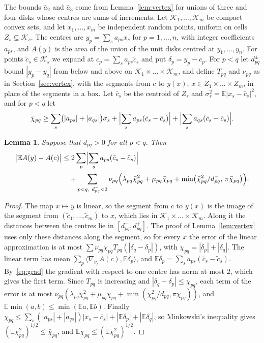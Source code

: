 \documentclass[11pt]{amsart}
\newtheorem{lemma}[theorem]{Lemma}
\theoremstyle{definition}
\theoremstyle{remark}
\numberwithin{equation}{section}
\newcommand{\E}{\mathbb{E}}
\begin{document}
The bounds $\bar a_2$ and $\bar a_3$ come from Lemma~\ref{lem:vertex} for unions of three and four disks whose centres are sums of increments. Let $\mathcal K_1,\dots,\mathcal K_m$ be compact convex sets, and let $x_1,\dots,x_m$ be independent random points, uniform on cells $Z_s\subseteq\mathcal K_s$. The centres are $y_p=\sum_sa_{ps}x_s$ for $p=1,\dots,n$, with integer coefficients $a_{ps}$, and $A(y)$ is the area of the union of the unit disks centred at $y_1,\dots,y_n$. For points $\tilde c_s\in\mathcal K_s$ we expand at $c_p=\sum_sa_{ps}\tilde c_s$ and put $\delta_p=y_p-c_p$. For $p<q$ let $d^\pm_{pq}$ bound $|y_p-y_q|$ from below and above on $\mathcal K_1\times\dots\times\mathcal K_m$, and define $T_{pq}$ and $\nu_{pq}$ as in Section~\ref{sec:vertex}, with the segments from $c$ to $y(x)$, $x\in Z_1\times\dots\times Z_m$, in place of the segments in a box. Let $\bar c_s$ be the centroid of $Z_s$ and $\sigma_s^2=\E|x_s-\bar c_s|^2$, and for $p<q$ let
\[
\bar\chi_{pq}\ge\sum_s\bigl(|a_{ps}|+|a_{qs}|\bigr)\sigma_s+\Bigl|\sum_sa_{ps}(\bar c_s-\tilde c_s)\Bigr|+\Bigl|\sum_sa_{qs}(\bar c_s-\tilde c_s)\Bigr|.
\]

\begin{lemma}\label{lem:linear}
Suppose that $d^-_{pq}>0$ for all $p<q$. Then
\begin{align*}
\bigl|\E A(y)-A(c)\bigr|&\le2\sum_p\Bigl|\sum_sa_{ps}(\bar c_s-\tilde c_s)\Bigr|\\
&\quad+\sum_{p<q,\ d^-_{pq}<2}\nu_{pq}\Bigl(\lambda_{pq}\bar\chi_{pq}^2+\mu_{pq}\bar\chi_{pq}+\min\bigl(\bar\chi_{pq}^2/d^-_{pq},\,\pi\bar\chi_{pq}\bigr)\Bigr).
\end{align*}
\end{lemma}

\begin{proof}
The map $x\mapsto y$ is linear, so the segment from $c$ to $y(x)$ is the image of the segment from $(\tilde c_1,\dots,\tilde c_m)$ to $x$, which lies in $\mathcal K_1\times\dots\times\mathcal K_m$. Along it the distances between the centres lie in $[d^-_{pq},d^+_{pq}]$. The proof of Lemma~\ref{lem:vertex} uses only these distances along the segment, so for every $x$ the error of the linear approximation is at most $\sum\nu_{pq}\chi_{pq}T_{pq}(|\delta_q-\delta_p|)$, with $\chi_{pq}=|\delta_p|+|\delta_q|$. The linear term has mean $\sum_p\langle\nabla_{y_p}A(c),\E\delta_p\rangle$, and $\E\delta_p=\sum_sa_{ps}(\bar c_s-\tilde c_s)$. By~\eqref{eq:grad} the gradient with respect to one centre has norm at most $2$, which gives the first term. Since $T_{pq}$ is increasing and $|\delta_q-\delta_p|\le\chi_{pq}$, each term of the error is at most $\nu_{pq}(\lambda_{pq}\chi_{pq}^2+\mu_{pq}\chi_{pq}+\min(\chi_{pq}^2/d^-_{pq},\pi\chi_{pq}))$, and $\E\min(a,b)\le\min(\E a,\E b)$. Finally $\chi_{pq}\le\sum_s(|a_{ps}|+|a_{qs}|)|x_s-\bar c_s|+|\E\delta_p|+|\E\delta_q|$, so Minkowski's inequality gives $(\E\chi_{pq}^2)^{1/2}\le\bar\chi_{pq}$, and $\E\chi_{pq}\le(\E\chi_{pq}^2)^{1/2}$.
\end{proof}
\end{document}
